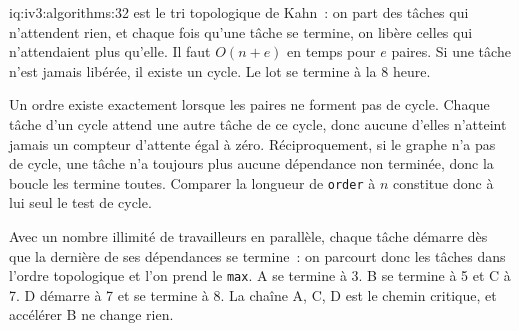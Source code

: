 \begin{solution}{iq:iv3:algorithms:32}
 est le tri topologique de Kahn~: on part des tâches qui n'attendent rien, et chaque fois qu'une tâche se termine, on libère celles qui n'attendaient plus qu'elle. Il faut $O(n + e)$ en temps pour $e$ paires. Si une tâche n'est jamais libérée, il existe un cycle. Le lot se termine à la 8 heure.
\label{lst:iv3:al:topo}

Un ordre existe exactement lorsque les paires ne forment pas de cycle. Chaque tâche d'un cycle attend une autre tâche de ce cycle, donc aucune d'elles n'atteint jamais un compteur d'attente égal à zéro. Réciproquement, si le graphe n'a pas de cycle, une tâche n'a toujours plus aucune dépendance non terminée, donc la boucle les termine toutes. Comparer la longueur de \texttt{order} à $n$ constitue donc à lui seul le test de cycle.

Avec un nombre illimité de travailleurs en parallèle, chaque tâche démarre dès que la dernière de ses dépendances se termine~: on parcourt donc les tâches dans l'ordre topologique et l'on prend le \texttt{max}. A se termine à 3. B se termine à 5 et C à 7. D démarre à 7 et se termine à 8. La chaîne A, C, D est le chemin critique, et accélérer B ne change rien.

\end{solution}

